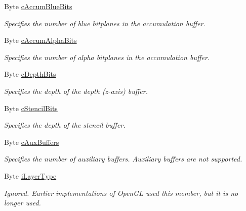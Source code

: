 \begin{DoxyCompactItemize}
Byte \hyperlink{struct_tao_1_1_platform_1_1_windows_1_1_gdi_1_1_p_i_x_e_l_f_o_r_m_a_t_d_e_s_c_r_i_p_t_o_r_acb16c445481897dd3d3c1892efd65fa5}{cAccumBlueBits}
\begin{DoxyCompactList}\small\item\em Specifies the number of blue bitplanes in the accumulation buffer. \item\end{DoxyCompactList}\item 
Byte \hyperlink{struct_tao_1_1_platform_1_1_windows_1_1_gdi_1_1_p_i_x_e_l_f_o_r_m_a_t_d_e_s_c_r_i_p_t_o_r_a9ac96be0a40a98bce22582529cb8d45a}{cAccumAlphaBits}
\begin{DoxyCompactList}\small\item\em Specifies the number of alpha bitplanes in the accumulation buffer. \item\end{DoxyCompactList}\item 
Byte \hyperlink{struct_tao_1_1_platform_1_1_windows_1_1_gdi_1_1_p_i_x_e_l_f_o_r_m_a_t_d_e_s_c_r_i_p_t_o_r_ac7f87af2fe3f317ba331c9e6da484867}{cDepthBits}
\begin{DoxyCompactList}\small\item\em Specifies the depth of the depth (z-\/axis) buffer. \item\end{DoxyCompactList}\item 
Byte \hyperlink{struct_tao_1_1_platform_1_1_windows_1_1_gdi_1_1_p_i_x_e_l_f_o_r_m_a_t_d_e_s_c_r_i_p_t_o_r_a09f40e25a8edadd1c3e20feae9899113}{cStencilBits}
\begin{DoxyCompactList}\small\item\em Specifies the depth of the stencil buffer. \item\end{DoxyCompactList}\item 
Byte \hyperlink{struct_tao_1_1_platform_1_1_windows_1_1_gdi_1_1_p_i_x_e_l_f_o_r_m_a_t_d_e_s_c_r_i_p_t_o_r_ac1d139bcff3eddaef2b43bc8b94d507a}{cAuxBuffers}
\begin{DoxyCompactList}\small\item\em Specifies the number of auxiliary buffers. Auxiliary buffers are not supported. \item\end{DoxyCompactList}\item 
Byte \hyperlink{struct_tao_1_1_platform_1_1_windows_1_1_gdi_1_1_p_i_x_e_l_f_o_r_m_a_t_d_e_s_c_r_i_p_t_o_r_a014b1ee8659cc68d34c1f01d4ece7cb3}{iLayerType}
\begin{DoxyCompactList}\small\item\em Ignored. Earlier implementations of OpenGL used this member, but it is no longer used. \item\end{DoxyCompactList}\item 

\end{DoxyCompactItemize}

